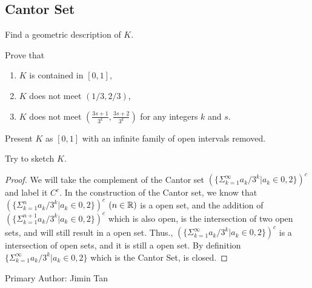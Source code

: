 \subsection{Cantor Set}

\begin{majorEx}
    Find a geometric description of $K$.

    Prove that
    \begin{enumerate}
        \item $K$ is contained in $[0,1]$,
        \item $K$ does not meet $(1/3, 2/3)$,
        \item $K$ does not meet $\left( \frac{3s+1}{3^k}, \frac{3s+2}{3^k}
            \right)$ for any integers $k$ and $s$.
    \end{enumerate}

    Present $K$ as $[0,1]$ with an infinite family of open intervals removed.

    Try to sketch $K$.
\end{majorEx}

\begin{proof}
We will take the complement of the Cantor set $(\{\Sigma_{k=1}^\infty a_k/3^k | a_k \in {0, 2}\})^c$ and label it $C^c$. In the construction of the
Cantor set, we know that $(\{\Sigma_{k=1}^n a_k/3^k | a_k \in {0, 2}\})^c$ $(n \in \mathbb{R})$ is a open set, and the addition of $(\{\Sigma_{k=1}^{n+1} a_k/3^k | a_k \in {0, 2}\})^c$ which is also open, is the intersection of two open sets, and will still result in a open set. Thus., $(\{\Sigma_{k=1}^\infty a_k/3^k | a_k \in {0, 2}\})^c$ is a intersection of open sets, and it is still a open set. By definition $\{\Sigma_{k=1}^\infty a_k/3^k | a_k \in {0, 2}\}$ which is the Cantor Set, is closed.
\end{proof}

Primary Author: Jimin Tan
